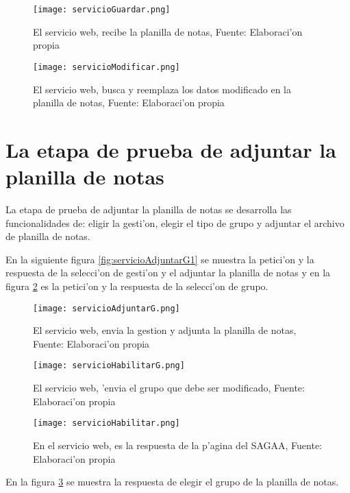 \begin{figure}[H]
\begin{minipage}{0.48\textwidth}
\centering
\texttt{[image: servicioGuardar.png]}
\caption{El servicio web, recibe la planilla de notas, Fuente: Elaboraci'on propia}
\label{fig:servicioGuardar} 
\end{minipage}\hfill
\begin{minipage}{0.48\textwidth}
\centering
\texttt{[image: servicioModificar.png]}
\caption{El servicio web, busca y reemplaza los datos modificado en la planilla de notas, Fuente: Elaboraci'on propia}
\label{fig:servicioModificar}
\end{minipage}
\end{figure}

\section{La etapa de prueba de adjuntar la planilla de notas} 
La etapa de prueba de adjuntar la planilla de notas se desarrolla las funcionalidades de: eligir la gesti'on, elegir el tipo de grupo y  adjuntar el archivo de planilla de notas.


En la siguiente figura \ref{fig:servicioAdjuntarG1} se muestra la petici'on y la respuesta de la selecci'on  de gesti'on y el adjuntar la planilla de notas y en la figura \ref{fig:servicioHabilitarG} es la petici'on y la respuesta de la selecci'on de grupo.   

\begin{figure}[H]
\begin{minipage}{0.48\textwidth}
\centering
\texttt{[image: servicioAdjuntarG.png]}
\caption{El servicio web, envia la gestion y adjunta la planilla de notas, Fuente: Elaboraci'on propia}
\label{fig:servicioAdjuntarG1}
\end{minipage}\hfill
\begin{minipage}{0.48\textwidth}
\centering
\texttt{[image: servicioHabilitarG.png]}
\caption{El servicio web, 'envia el grupo que debe ser modificado, Fuente: Elaboraci'on propia}
\label{fig:servicioHabilitarG}
\end{minipage}
\end{figure}

\begin{figure}[H]
\centering
\texttt{[image: servicioHabilitar.png]}
\captionsetup{justification=centering, margin=2cm}
\caption{En el servicio web, es la respuesta de la p'agina del SAGAA, Fuente: Elaboraci'on propia}
\label{fig:habilitadoG}
\end{figure}
En la figura \ref{fig:habilitadoG} se muestra la respuesta de elegir el grupo de la planilla de notas.
